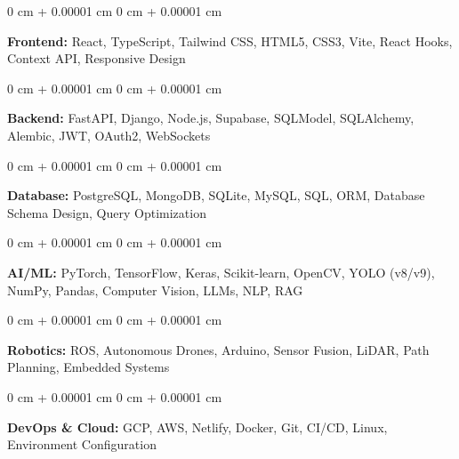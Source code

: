 \documentclass[10pt, letterpaper]{article}
\newenvironment{onecolentry}{
    \begin{adjustwidth}{
        0 cm + 0.00001 cm
    }{
        0 cm + 0.00001 cm
    }
}{
    \end{adjustwidth}
} %
\begin{document}
        \vspace{0.2 cm}

        \begin{onecolentry}
            \textbf{Frontend:} React, TypeScript, Tailwind CSS, HTML5, CSS3, Vite, React Hooks, Context API, Responsive Design
        \end{onecolentry}

        \vspace{0.2 cm}

        \begin{onecolentry}
            \textbf{Backend:} FastAPI, Django, Node.js, Supabase, SQLModel, SQLAlchemy, Alembic, JWT, OAuth2, WebSockets
        \end{onecolentry}

        \vspace{0.2 cm}

        \begin{onecolentry}
            \textbf{Database:} PostgreSQL, MongoDB, SQLite, MySQL, SQL, ORM, Database Schema Design, Query Optimization
        \end{onecolentry}

        \vspace{0.2 cm}

        \begin{onecolentry}
            \textbf{AI/ML:} PyTorch, TensorFlow, Keras, Scikit-learn, OpenCV, YOLO (v8/v9), NumPy, Pandas, Computer Vision, LLMs, NLP, RAG
        \end{onecolentry}

        \vspace{0.2 cm}

        \begin{onecolentry}
            \textbf{Robotics:} ROS, Autonomous Drones, Arduino, Sensor Fusion, LiDAR, Path Planning, Embedded Systems
        \end{onecolentry}

        \vspace{0.2 cm}

        \begin{onecolentry}
            \textbf{DevOps \& Cloud:} GCP, AWS, Netlify, Docker, Git, CI/CD, Linux, Environment Configuration
        \end{onecolentry}


    
\end{document}
